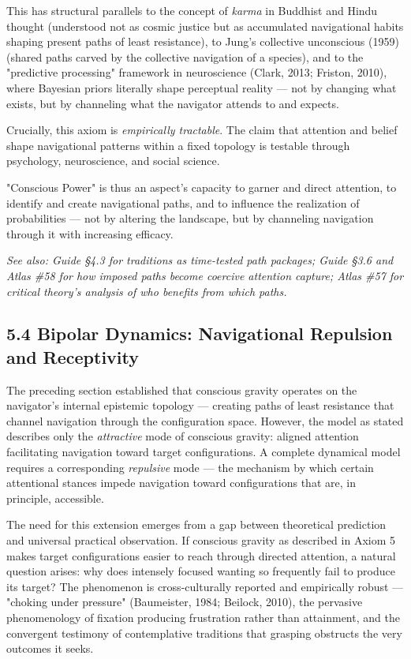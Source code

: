 This has structural parallels to the concept of \textit{karma} in Buddhist and Hindu thought (understood not as cosmic justice but as accumulated navigational habits shaping present paths of least resistance), to Jung's collective unconscious (1959) (shared paths carved by the collective navigation of a species), and to the "predictive processing" framework in neuroscience (Clark, 2013; Friston, 2010), where Bayesian priors literally shape perceptual reality — not by changing what exists, but by channeling what the navigator attends to and expects.


Crucially, this axiom is \textit{empirically tractable}. The claim that attention and belief shape navigational patterns within a fixed topology is testable through psychology, neuroscience, and social science.


"Conscious Power" is thus an aspect's capacity to garner and direct attention, to identify and create navigational paths, and to influence the realization of probabilities — not by altering the landscape, but by channeling navigation through it with increasing efficacy.


\textit{See also: Guide §4.3 for traditions as time-tested path packages; Guide §3.6 and Atlas \#58 for how imposed paths become coercive attention capture; Atlas \#57 for critical theory's analysis of who benefits from which paths.}


\subsection*{5.4 Bipolar Dynamics: Navigational Repulsion and Receptivity}


The preceding section established that conscious gravity operates on the navigator's internal epistemic topology — creating paths of least resistance that channel navigation through the configuration space. However, the model as stated describes only the \textit{attractive} mode of conscious gravity: aligned attention facilitating navigation toward target configurations. A complete dynamical model requires a corresponding \textit{repulsive} mode — the mechanism by which certain attentional stances impede navigation toward configurations that are, in principle, accessible.


The need for this extension emerges from a gap between theoretical prediction and universal practical observation. If conscious gravity as described in Axiom 5 makes target configurations easier to reach through directed attention, a natural question arises: why does intensely focused wanting so frequently fail to produce its target? The phenomenon is cross-culturally reported and empirically robust — "choking under pressure" (Baumeister, 1984; Beilock, 2010), the pervasive phenomenology of fixation producing frustration rather than attainment, and the convergent testimony of contemplative traditions that grasping obstructs the very outcomes it seeks.



